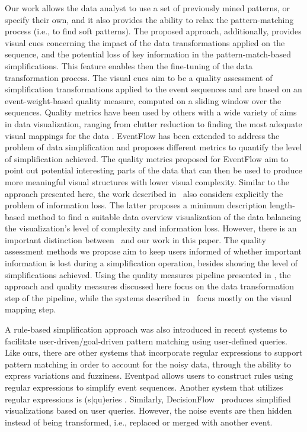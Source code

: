 \documentclass[camera]{vgtc}                          %
\begin{document}
Our work allows the data analyst to use a set of previously mined patterns, or specify their own, and it also provides the ability to relax the pattern-matching process (i.e., to find soft patterns\cite{Gotz2016Soft}).
The proposed approach, additionally, provides visual cues concerning the impact of the data transformations applied on the sequence, and the potential loss of key information in the pattern-match-based simplifications. This feature enables then the fine-tuning of the data transformation process.
The visual cues aim to be a quality assessment of simplification transformations applied to the event sequences and are based on an event-weight-based quality measure, computed on a sliding window over the sequences.
Quality metrics have been used by others with a wide variety of aims in data visualization, ranging from clutter reduction to finding the most adequate visual mappings for the data \cite{Bertini2011Quality}.
EventFlow has been extended \cite{Mauriello16EventFlow} to address the problem of data simplification and proposes different metrics to quantify the level of simplification achieved.
The quality metrics proposed for EventFlow aim to point out potential interesting parts of the data that can then be used to produce more meaningful visual structures with lower visual complexity.
Similar to the approach presented here, the work described in~\cite{Chen2018Sequence} also considers explicitly the problem of information loss. The latter proposes a minimum description length-based method to find a suitable data overview visualization of the data balancing the visualization's level of complexity and information loss.
However, there is an important distinction between~\cite{Mauriello16EventFlow, Chen2018Sequence} and our work in this paper.
The quality assessment methods we propose aim to keep users informed of whether important information is lost during a simplification operation, besides showing the level of simplifications achieved.
Using the quality measures pipeline presented in \cite{Bertini2011Quality}, the approach and quality measures discussed here focus on the data transformation step of the pipeline, while the systems described in~\cite{Mauriello16EventFlow, Chen2018Sequence} focus mostly on the visual mapping step.

A rule-based simplification approach was also introduced in recent systems to facilitate user-driven/goal-driven pattern matching using user-defined queries.
Like ours, there are other systems that incorporate regular expressions to support pattern matching in order to account for the noisy data, through the ability to express variations and fuzziness.
Eventpad \cite{Cappers2018Exploring} allows users to construct rules using regular expressions to simplify event sequences. Another system that utilizes regular expressions is (s$|$qu)eries \cite{Zgraggen2015Squeries}. Similarly, DecisionFlow~\cite{Gotz2014DecisionFlow} produces simplified visualizations based on user queries. However, the noise events are then hidden instead of being transformed, i.e., replaced or merged with another event.
\end{document}
